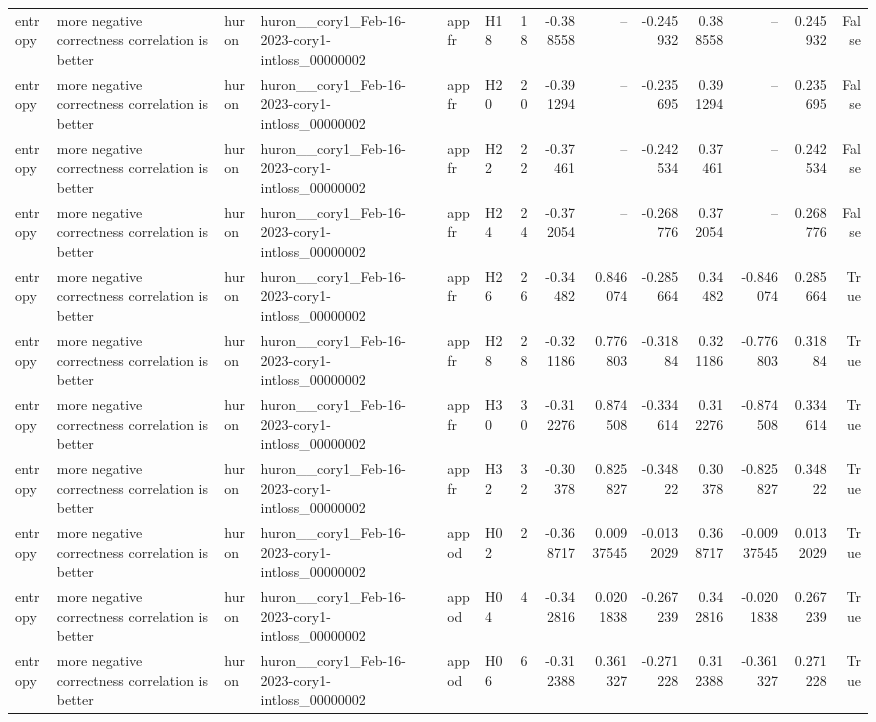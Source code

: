 \begin{longtable}{llllllrrrrrrrr}
entropy & more negative correctness correlation is better & huron & huron\_\_cory1\_Feb-16-2023-cory1-intloss\_00000002 & appfr & H18 & 18 & -0.388558 & -- & -0.245932 & 0.388558 & -- & 0.245932 & False \\
entropy & more negative correctness correlation is better & huron & huron\_\_cory1\_Feb-16-2023-cory1-intloss\_00000002 & appfr & H20 & 20 & -0.391294 & -- & -0.235695 & 0.391294 & -- & 0.235695 & False \\
entropy & more negative correctness correlation is better & huron & huron\_\_cory1\_Feb-16-2023-cory1-intloss\_00000002 & appfr & H22 & 22 & -0.37461 & -- & -0.242534 & 0.37461 & -- & 0.242534 & False \\
entropy & more negative correctness correlation is better & huron & huron\_\_cory1\_Feb-16-2023-cory1-intloss\_00000002 & appfr & H24 & 24 & -0.372054 & -- & -0.268776 & 0.372054 & -- & 0.268776 & False \\
entropy & more negative correctness correlation is better & huron & huron\_\_cory1\_Feb-16-2023-cory1-intloss\_00000002 & appfr & H26 & 26 & -0.34482 & 0.846074 & -0.285664 & 0.34482 & -0.846074 & 0.285664 & True \\
entropy & more negative correctness correlation is better & huron & huron\_\_cory1\_Feb-16-2023-cory1-intloss\_00000002 & appfr & H28 & 28 & -0.321186 & 0.776803 & -0.31884 & 0.321186 & -0.776803 & 0.31884 & True \\
entropy & more negative correctness correlation is better & huron & huron\_\_cory1\_Feb-16-2023-cory1-intloss\_00000002 & appfr & H30 & 30 & -0.312276 & 0.874508 & -0.334614 & 0.312276 & -0.874508 & 0.334614 & True \\
entropy & more negative correctness correlation is better & huron & huron\_\_cory1\_Feb-16-2023-cory1-intloss\_00000002 & appfr & H32 & 32 & -0.30378 & 0.825827 & -0.34822 & 0.30378 & -0.825827 & 0.34822 & True \\
entropy & more negative correctness correlation is better & huron & huron\_\_cory1\_Feb-16-2023-cory1-intloss\_00000002 & appod & H02 & 2 & -0.368717 & 0.00937545 & -0.0132029 & 0.368717 & -0.00937545 & 0.0132029 & True \\
entropy & more negative correctness correlation is better & huron & huron\_\_cory1\_Feb-16-2023-cory1-intloss\_00000002 & appod & H04 & 4 & -0.342816 & 0.0201838 & -0.267239 & 0.342816 & -0.0201838 & 0.267239 & True \\
entropy & more negative correctness correlation is better & huron & huron\_\_cory1\_Feb-16-2023-cory1-intloss\_00000002 & appod & H06 & 6 & -0.312388 & 0.361327 & -0.271228 & 0.312388 & -0.361327 & 0.271228 & True \\

\end{longtable}
